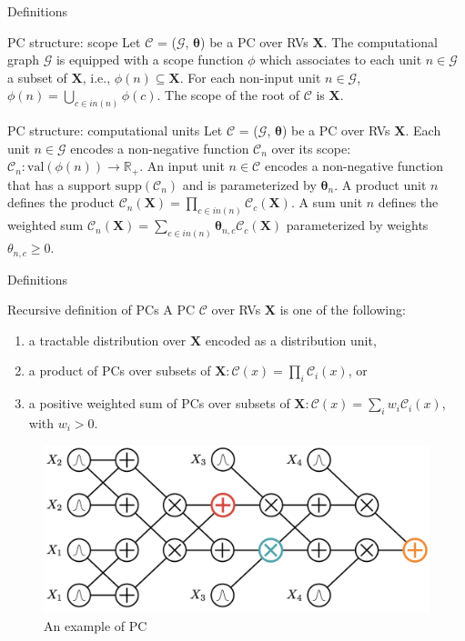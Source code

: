 \documentclass{beamer}
\begin{document}
\begin{frame}{Definitions}
    \begin{block}{PC structure: scope}
        Let $\mathcal{C}$ = ($\mathcal{G}$, $\mathbf{\theta}$) be a PC over RVs $\mathbf{X}$. The computational graph $\mathcal{G}$ is equipped with a scope function $\phi$ which associates to each unit $n \in \mathcal{G}$ a
        subset of $\mathbf{X}$, i.e., $\phi(n) \subseteq \mathbf{X}$. For each non-input unit $n \in \mathcal{G}$, $\phi(n) = \bigcup_{c \in in(n)}\phi(c)$. The scope
of the root of $\mathcal{C}$ is $\mathbf{X}$.
    \end{block}

    \begin{block}{PC structure: computational units}
        Let $\mathcal{C}$ = ($\mathcal{G}$, $\mathbf{\theta}$) be a PC over RVs
        $\mathbf{X}$. Each unit $n \in \mathcal{G}$ encodes a non-negative function $\mathcal{C}_n$ over its scope: $\mathcal{C}_n : \mathrm{val}(\phi(n)) \rightarrow \mathbb{R}_{+}$.
        An input unit $n \in \mathcal{C}$ encodes a non-negative function that has a support $\mathrm{supp}(\mathcal{C}_n)$ and is
        parameterized by $\mathbf{\theta}_n$.
        A product unit $n$ defines the product $\mathcal{C}_n (\mathbf{X}) = \prod_{c \in in(n)}
        \mathcal{C}_c(\mathbf{X})$. A
        sum unit $n$ defines the weighted sum $\mathcal{C}_n(\mathbf{X}) = \sum_{c \in in(n)}
        \mathbf{\theta}_{n,c}\mathcal{C}_c(\mathbf{X})$ parameterized by weights $\theta_{n, c} \geq 0$.
    \end{block}
\end{frame}

\begin{frame}{Definitions}
    \begin{block}{Recursive definition of PCs}
        A PC $\mathcal{C}$ over RVs $\mathbf{X}$ is one of the following:
        \begin{enumerate}

            \item a tractable distribution over $\mathbf{X}$ encoded as a distribution unit,
            \item a product of PCs over subsets of $\mathbf{X}:
            \mathcal{C}(x) = \prod_i \mathcal{C}_i(x)$, or
            \item a positive weighted sum of PCs over subsets of  $\mathbf{\mathbf{X}}: \mathcal{C}(x) = \sum_i w_i\mathcal{C}_i(x)$, with $w_i > 0$.
        \end{enumerate}
    \end{block}

    \begin{figure}
        \centering
        \includegraphics[width=0.5\linewidth]{fst.png}
        \caption{An example of PC}
        \label{fig:pc-example}
    \end{figure}
\end{frame}
\end{document}
